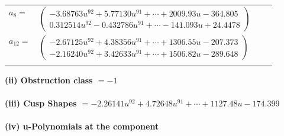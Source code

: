 \documentclass[1p]{elsarticle_modified}
\theoremstyle{definition}
\begin{document}
\begin{tabular}{m{7pt} m{180pt} m{7pt} m{180pt} }
\flushright $a_{8}=$&$\begin{pmatrix}-3.68763 u^{92}+5.77130 u^{91}+\cdots+2009.93 u-364.805\\0.312514 u^{92}-0.432786 u^{91}+\cdots-141.093 u+24.4478\end{pmatrix}$ \\
\flushright $a_{12}=$&$\begin{pmatrix}-2.67125 u^{92}+4.38356 u^{91}+\cdots+1306.55 u-207.373\\-2.16240 u^{92}+3.42633 u^{91}+\cdots+1506.82 u-289.648\end{pmatrix}$\\&\end{tabular}
\flushleft \textbf{(ii) Obstruction class $= -1$}\\~\\
\flushleft \textbf{(iii) Cusp Shapes $= -2.26141 u^{92}+4.72648 u^{91}+\cdots+1127.48 u-174.399$}\\~\\
\newpage\renewcommand{\arraystretch}{1}
\flushleft \textbf{(iv) u-Polynomials at the component}\newline \\
\end{document}
